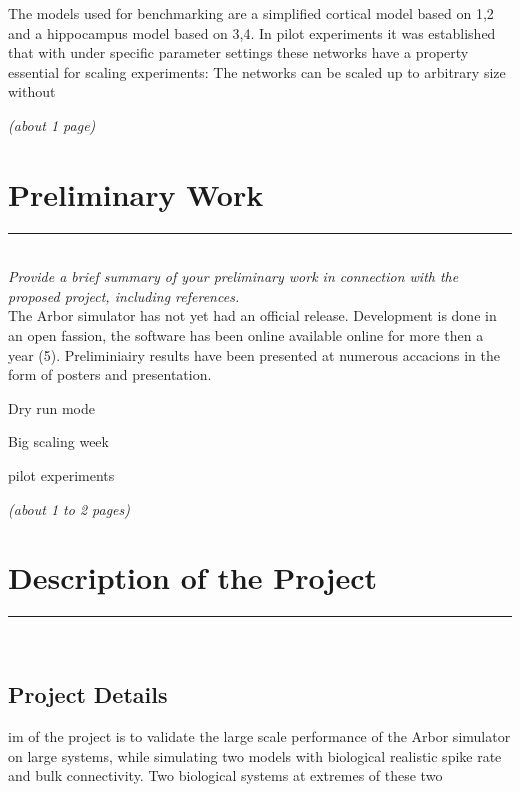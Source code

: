 \documentclass [a4paper, 12pt]{article}
\begin{document}
The models used for benchmarking are a simplified cortical model based on 1,2 and a hippocampus model based on 3,4. In pilot experiments it was established that with under specific parameter settings these networks have a property essential for scaling experiments: The networks can be scaled up to arbitrary size without 

\textit{(about 1 page)}
\section{Preliminary Work}
\rule{\textwidth}{0.4pt}\\
\textit{Provide a brief summary of your preliminary work in connection with the proposed project, including references.}\\

The Arbor simulator has not yet had an official release. Development is done in an open fassion, the software has been online available online for more then a year (5). Preliminiairy results have been presented at numerous accacions in the form of posters and presentation.


Dry run mode

Big scaling week

pilot experiments


\textit{(about 1 to 2 pages)}
\section{Description of the Project}
\rule{\textwidth}{0.4pt}\\
\subsection{Project Details}

im of the project is to validate the large scale performance of the Arbor simulator on large systems, while simulating two models with biological realistic spike rate and bulk connectivity. 
Two biological systems at extremes of these two 
\end{document}
